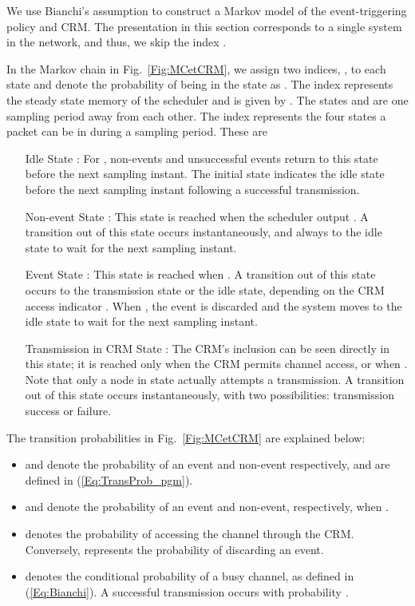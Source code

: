 \documentclass[journal]{IEEEtran}
\begin{document}
We use Bianchi's assumption to construct a Markov model of the event-triggering policy and CRM. The presentation in this section corresponds to a single system in the network, and thus, we skip the index .

In the Markov chain in Fig.~\ref{Fig:MCetCRM}, we assign two indices, , to each state and denote the probability of being in the state as . The index  represents the steady state memory of the scheduler and is given by . The states  and  are one sampling period away from each other. The index  represents the four states a packet can be in during a sampling period. These are
\begin{enumerate}
\item  [Idle State]: For , non-events and unsuccessful events return to this state before the next sampling instant. The initial state  indicates the idle state before the next sampling instant following a successful transmission.
\item  [Non-event State]: This state is reached when the scheduler output . A transition out of this state occurs instantaneously, and always to the idle state to wait for the next sampling instant.
\item  [Event State]: This state is reached when . A transition out of this state occurs to the transmission state or the idle state, depending on the CRM access indicator . When , the event is discarded and the system moves to the idle state to wait for the next sampling instant.
\item  [Transmission in CRM State]: The CRM's inclusion can be seen directly in this state; it is reached only when the CRM permits channel access, or when . Note that only a node in state  actually attempts a transmission. A transition out of this state occurs instantaneously, with two possibilities: transmission success or failure.
\end{enumerate}

The transition probabilities in Fig.~\ref{Fig:MCetCRM} are explained below:
\begin{itemize}
\item  and  denote the probability of an event and non-event respectively, and are defined in (\ref{Eq:TransProb_pgm}).
\item  and  denote the probability of an event and non-event, respectively, when .
\item  denotes the probability of accessing the channel through the CRM. Conversely,  represents the probability of discarding an event.
\item  denotes the conditional probability of a busy channel, as defined in (\ref{Eq:Bianchi}). A successful transmission occurs with probability .
\end{itemize}
\end{document}
